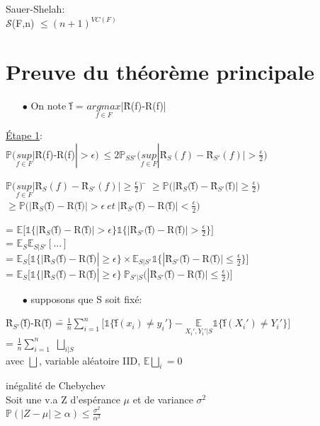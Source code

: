 \documentclass[a4paper]{report}
\begin{document}
\begin{lemma}
Sauer-Shelah:\\
$\mathcal{S}$(F,n) $ \leq (n+1)^{VC(F)}$
\end{lemma}

\section{Preuve du théorème principale}
\begin{itemize}
\item[$\bullet$]On note \~f = $\underset{f\in F}{argmax}$|\^R(f)-R(f)|\\
\end{itemize}
\underline{Étape 1}:\\
$\mathds{P}(\underset{f\in F}{sup}|$\^R(f)-R(f)$| > \epsilon)\ \leq 2\mathds{P}_{SS'}(\underset{f\in F}{sup}|$\^R$_S(f)-$\^R$_{S'}(f)| > \frac{\epsilon}{2})$\\
\begin{tabbing}
$\mathds{P}(\underset{f\in F}{sup}|$\^R$_S(f)-$\^R$_{S'}(f)| \geq \frac{\epsilon}{2})$ \= $\geq \mathds{P}(|$\^R$_S($\~f$)-$\^R$_{S'}($\~f$)| \geq \frac{\epsilon}{2})$\\
\> $\geq \mathds{P}(|$\^R$_S($\~f$)-$R$($\~f$)| > \epsilon\ et\ |$\^R$_{S'}($\~f$)-$R$($\~f$)| < \frac{\epsilon}{2})$\\
\end{tabbing}
= $ \mathds{E}[\mathds{1}\{|$\^R$_S($\~f$)-$R$($\~f$)|>\epsilon\}\mathds{1}\{|$\^R$_{S'}($\~f$)-$R$($\~f$)|>\frac{\epsilon}{2}\}] $\\
= $ \mathds{E}_S \mathds{E}_{S|S'}[...] $\\
= $ \mathds{E}_S[\mathds{1}\{|$\^R$_S($\~f$)-$R$($\~f$)|\geq \epsilon\}\times \mathds{E}_{S|S'}\mathds{1}\{|$\^R$_{S'}($\~f$)-$R$($\~f$)|\leq \frac{\epsilon}{2}\}] $\\
= $ \mathds{E}_S[\mathds{1}\{|$\^R$_S($\~f$)-$R$($\~f$)|\geq \epsilon\}\ \mathds{P}_{S'|S}(|$\^R$_{S'}($\~f$)-$R$($\~f$)|\leq \frac{\epsilon}{2})] $\\

\begin{itemize}
\item[$\bullet$]supposons que S soit fixé:\\
\end{itemize}
\begin{tabbing}
\^R$_{S'}$(\~f)-R(\~f) \= = $\frac{1}{n}\displaystyle { \sum_{i=1}^{n}}[\mathds{1}\{$\~f$(x_i)\neq y_i'\}-\underset{X_i', Y_i'|S}{\mathds{E}}\mathds{1}\{$\~f$(X_i')\neq Y_i'\}]$\\
\> = $\frac{1}{n}\displaystyle{\sum_{i=1}^{n}}$ $\bigsqcup _{i|S}$\\
\> avec $\bigsqcup $, variable aléatoire IID, $\mathds{E}\bigsqcup _i = 0$\\
\end{tabbing}
\begin{rappel}
inégalité de Chebychev\\
Soit une v.a Z d’espérance $\mu $ et de variance $\sigma^2$\\
$\mathds{P}(|Z-\mu|\geq \alpha)\leq \frac{\sigma^2}{\alpha^2} $\\
\end{rappel}
\end{document}
